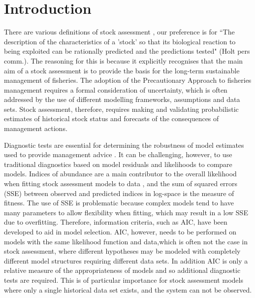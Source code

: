 \documentclass[12pt,halfline,a4paper,nonumbib]{ouparticle}
\begin{document}
\date{\today}


\maketitle

\section{Introduction}

There are various definitions of stock assessment \parencite[e.g.][]{hilborn2003state,cadrin2014stock}, our preference is for ``The description of the characteristics of a 'stock' so that its biological reaction to being exploited can be rationally predicted and the predictions tested" (Holt pers comm.). The reasoning for this is  because it explicitly recognises that the main aim of a stock assessment is to provide the basis for the long-term sustainable management of fisheries. The adoption of the Precautionary Approach to fisheries management \parencite[PA,][]{garcia1996precautionary} requires a formal consideration of uncertainty, which is often addressed by the use of different modelling frameworks, assumptions and data sets. Stock assessment, therefore, requires making and validating probabilistic estimates of historical stock status and forecasts of the consequences of management actions. 

Diagnostic tests are essential for determining the robustness of model estimates used to provide management advice \parencite{carvalho2020cookbook}. It can be challenging, however, to use traditional diagnostics based on model residuals and likelihoods to compare models. Indices of abundance are a main contributor to the overall likelihood when fitting stock assessment models to data \parencite{whitten2013accounting}, and the sum of squared errors (SSE) between observed and predicted indices in log-space is the measure of fitness. The use of SSE is problematic because complex models tend to have many parameters to allow flexibility when fitting, which may result in a low SSE due to overfitting. Therefore, information criteria, such as AIC, have been developed to aid in model selection. AIC, however, needs to be performed on models with the same likelihood function and data,which is often not the case in stock assessment, where different hypotheses may be modeled with completely different model structures requiring different data sets. In addition AIC is only a relative measure of the appropriateness of models and so additional diagnostic tests are required. This is of particular importance for stock assessment models where only a single historical data set exists, and the system can not be observed. 
\end{document}
